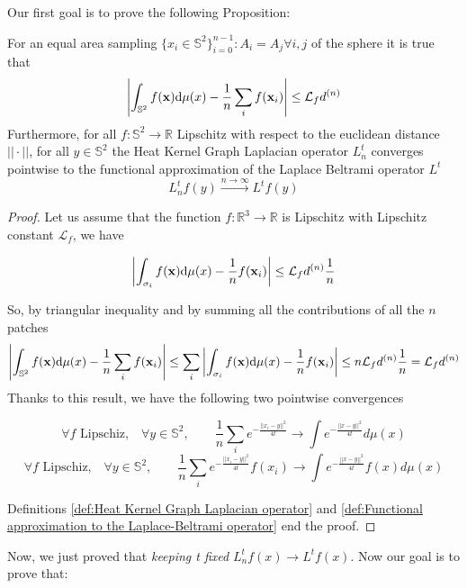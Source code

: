 Our first goal is to prove the following Proposition: 
\vspace{0.5cm}
\begin{prop}\label{prop:1}
	For an equal area sampling $\{x_i\in\mathbb S^2\}_{i=0}^{n-1}: A_i=A_j \forall i,j$ of the sphere it is true that
	$$
	\left| \int_{\mathbb S^2}f({\bf x})\text{d}{\mu(x)} - \frac{1}{n}\sum_i f(\mathbf x_i)\right|\leq \mathcal L_fd^{(n)}
	$$
	Furthermore, for all $f: \mathbb S^2 \rightarrow \mathbb R$ Lipschitz with respect to the euclidean distance $||\cdot||$, for all $y\in\mathbb S^2$ the Heat Kernel Graph Laplacian operator $L^t_n$ converges pointwise to the functional approximation of the Laplace Beltrami operator $L^t$
	$$ L_n^tf(y)\xrightarrow{n\to\infty} L^tf(y)$$
\end{prop} 
\vspace{0.5cm}


\begin{proof}
	Let us assume that the function $f:\mathbb R^3\rightarrow \mathbb R$ is Lipschitz with Lipschitz constant $\mathcal L_f$, we have 
	
	$$\left| \int_{\sigma_{i}}f({\bf x})\text{d}{\mu(x)} - \frac{1}{n}f(\mathbf x_i)\right| \leq \mathcal L_fd^{(n)}\frac{1}{n} $$

	So, by triangular inequality and by summing all the contributions of all the $n$ patches
	$$\left| \int_{\mathbb S^2}f({\bf x})\text{d}{\mu(x)} - \frac{1}{n}\sum_i f(\mathbf x_i)\right| \leq \sum_i \left| \int_{\sigma_{i}}f({\bf x})\text{d}{\mu(x)} - \frac{1}{n}f(\mathbf x_i)\right|\leq n  \mathcal L_fd^{(n)}\frac{1}{n} = \mathcal L_fd^{(n)}$$	
	Thanks to this result, we have the following two pointwise convergences
	
	$$\forall f \text{ Lipschiz,}\quad \forall y\in\mathbb S^2,  \quad\quad \frac{1}{n}\sum_i e^{-\frac{||x_i-y||^2}{4t}}\rightarrow \int e^{-\frac{||x-y||^2}{4t}}d\mu(x)$$
	$$\forall f \text{ Lipschiz,}\quad \forall y\in\mathbb S^2,  \quad\quad \frac{1}{n}\sum_i e^{-\frac{||x_i-y||^2}{4t}}f(x_i)\rightarrow \int e^{-\frac{||x-y||^2}{4t}}f(x)d\mu(x)$$
	
	Definitions \ref{def:Heat Kernel Graph Laplacian operator} and \ref{def:Functional approximation to the Laplace-Beltrami operator} end the proof.
\end{proof}
\vspace{0.5cm}

Now, we just proved that \textit{keeping t fixed} $L_n^tf(x)\rightarrow L^tf(x)$. Now our goal is to prove that:

